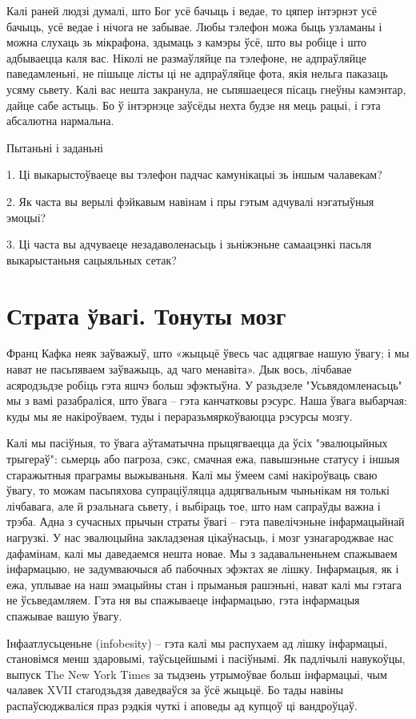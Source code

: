 Калі раней людзі думалі, што Бог усё бачыць і ведае, то цяпер інтэрнэт усё бачыць, усё ведае і нічога не забывае. Любы тэлефон можа быць узламаны і можна слухаць зь мікрафона, здымаць з камэры ўсё, што вы робіце і што адбываецца каля вас. Ніколі не размаўляйце па тэлефоне, не адпраўляйце паведамленьні, не пішыце лісты ці не адпраўляйце фота, якія нельга паказаць усяму сьвету. Калі вас нешта закранула, не сьпяшаецеся пісаць гнеўны камэнтар, дайце сабе астыць. Бо ў інтэрнэце заўсёды нехта будзе ня мець рацыі, і гэта абсалютна нармальна.

Пытаньні і заданьні

1. Ці выкарыстоўваеце вы тэлефон падчас камунікацыі зь іншым чалавекам?

2. Як часта вы верылі фэйкавым навінам і пры гэтым адчувалі нэгатыўныя эмоцыі?

3. Ці часта вы адчуваеце незадаволенасьць і зьніжэньне самаацэнкі пасьля выкарыстаньня сацыяльных сетак?


\section{Страта ўвагі. Тонуты мозг}

Франц Кафка неяк заўважыў, што «жыцьцё ўвесь час адцягвае нашую ўвагу; і мы нават не пасьпяваем заўважыць, ад чаго менавіта». Дык вось, лічбавае асяродзьдзе робіць гэта яшчэ больш эфэктыўна. У разьдзеле "Усьвядомленасьць" мы з вамі разабраліся, што ўвага – гэта канчатковы рэсурс. Наша ўвага выбарчая: куды мы яе накіроўваем, туды і пераразьмяркоўваюцца рэсурсы мозгу.

Калі мы пасіўныя, то ўвага аўтаматычна прыцягваецца да ўсіх "эвалюцыйных трыгераў": сьмерць або пагроза, сэкс, смачная ежа, павышэньне статусу і іншыя старажытныя праграмы выжываньня. Калі мы ўмеем самі накіроўваць сваю ўвагу, то можам пасьпяхова супраціўляцца адцягвальным чыньнікам ня толькі лічбавага, але й рэальнага сьвету, і выбіраць тое, што нам сапраўды важна і трэба. Адна з сучасных прычын страты ўвагі – гэта павелічэньне інфармацыйнай нагрузкі. У нас эвалюцыйна закладзеная цікаўнасьць, і мозг узнагароджвае нас дафамінам, калі мы даведаемся нешта новае. Мы з задавальненьнем спажываем інфармацыю, не задумваючыся аб пабочных эфэктах яе лішку. Інфармацыя, як і ежа, уплывае на наш эмацыйны стан і прыманыя рашэньні, нават калі мы гэтага не ўсьведамляем. Гэта ня вы спажываеце інфармацыю, гэта інфармацыя спажывае вашую ўвагу.

Інфаатлусьценьне (infobesity) – гэта калі мы распухаем ад лішку інфармацыі, становімся менш здаровымі, таўсьцейшымі і пасіўнымі. Як падлічылі навукоўцы, выпуск The New York Times за тыдзень утрымоўвае больш інфармацыі, чым чалавек XVII стагодзьдзя даведваўся за ўсё жыцьцё. Бо тады навіны распаўсюджваліся праз рэдкія чуткі і аповеды ад купцоў ці вандроўцаў.


